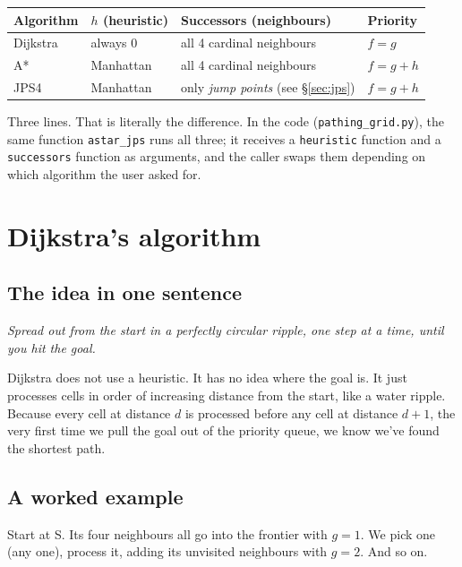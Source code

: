 \documentclass[11pt,a4paper]{article}
\begin{document}
\begin{center}
\renewcommand{\arraystretch}{1.25}
\begin{tabular}{@{}llll@{}}
\toprule
\textbf{Algorithm} & $h$ (heuristic) & \textbf{Successors (neighbours)} & \textbf{Priority} \\
\midrule
Dijkstra & always $0$ & all 4 cardinal neighbours & $f = g$ \\
A*       & Manhattan  & all 4 cardinal neighbours & $f = g + h$ \\
JPS4     & Manhattan  & only \emph{jump points} (see \S\ref{sec:jps}) & $f = g + h$ \\
\bottomrule
\end{tabular}
\end{center}

Three lines. That is literally the difference. In the code (\texttt{pathing\_grid.py}), the same function \texttt{astar\_jps} runs all three; it receives a \texttt{heuristic} function and a \texttt{successors} function as arguments, and the caller swaps them depending on which algorithm the user asked for.

\clearpage
\section{Dijkstra's algorithm}\label{sec:dijk}

\subsection{The idea in one sentence}

\emph{Spread out from the start in a perfectly circular ripple, one step at a time, until you hit the goal.}

Dijkstra does not use a heuristic. It has no idea where the goal is. It just processes cells in order of increasing distance from the start, like a water ripple. Because every cell at distance $d$ is processed before any cell at distance $d+1$, the very first time we pull the goal out of the priority queue, we know we've found the shortest path.

\subsection{A worked example}

Start at S. Its four neighbours all go into the frontier with $g=1$. We pick one (any one), process it, adding its unvisited neighbours with $g=2$. And so on.
\end{document}
